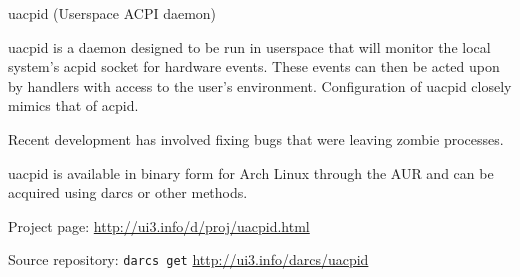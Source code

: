 \begin{hcarentry}{uacpid (Userspace ACPI daemon)}
\makeheader

uacpid is a daemon designed to be run in userspace that will monitor the local system's acpid socket for hardware events. These events can then be acted upon by handlers with access to the user's environment. Configuration of uacpid closely mimics that of acpid.

Recent development has involved fixing bugs that were leaving zombie processes.

uacpid is available in binary form for Arch Linux through the AUR and can be acquired using darcs or other methods.

\FurtherReading
\begin{compactitem}
\item Project page:
\url{http://ui3.info/d/proj/uacpid.html}

\item Source repository:
\texttt{darcs get} \url{http://ui3.info/darcs/uacpid}
\end{compactitem}
\end{hcarentry}
